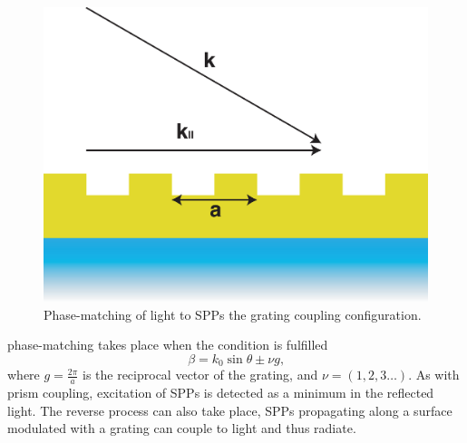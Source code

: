 \begin{figure}[htb]
\centering
\includegraphics[scale=0.5]{THM/grating.eps}
\caption{\label{fig:grating}Phase-matching of light to SPPs the grating coupling configuration.}
\end{figure}
phase-matching takes place when the condition is fulfilled
\begin{equation}
\beta = k_0 \sin{\theta} \pm \nu g\text{,}
\end{equation}
where $g=\frac{2\pi}{a}$ is the reciprocal vector of the grating, and $\nu=(1,2,3\dots)$.
As with prism coupling, excitation of SPPs is detected as a minimum in the reflected light. The reverse process can also take place, SPPs propagating along a surface modulated with a grating can couple to light and thus radiate. 

%
%